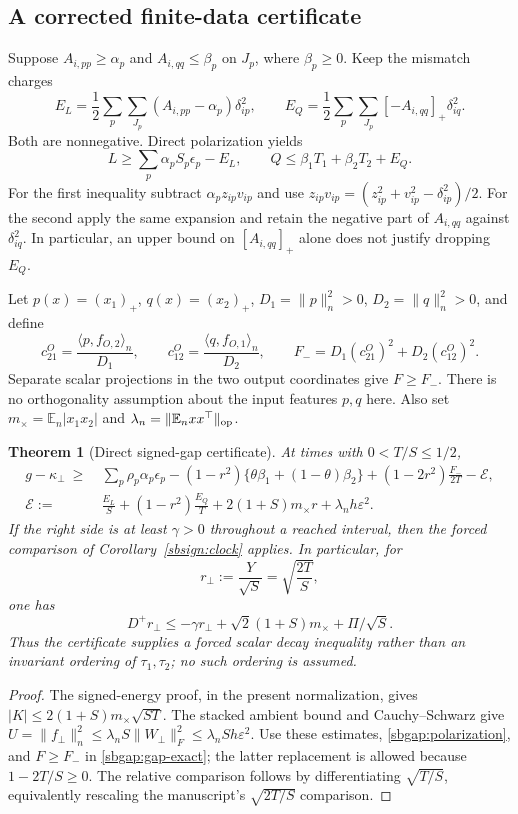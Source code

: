 \documentclass{article} %
\theoremstyle{plain}
\newtheorem{theorem}{Theorem}[section]
\theoremstyle{definition}
\theoremstyle{remark}
\begin{document}
\subsection{A corrected finite-data certificate}

Suppose $A_{i,pp}\ge\alpha_p$ and $A_{i,qq}\le\beta_p$ on $J_p$,
where $\beta_p\ge0$. Keep the mismatch charges
\[
 E_L=\frac12\sum_p\sum_{J_p}(A_{i,pp}-\alpha_p)\delta_{ip}^2,\qquad
 E_Q=\frac12\sum_p\sum_{J_p}[-A_{i,qq}]_+\delta_{iq}^2.
\]
Both are nonnegative. Direct polarization yields
\begin{equation}\label{sbgap:polarization}
 L\ge\sum_p\alpha_p S_p\epsilon_p-E_L,\qquad
 Q\le\beta_1T_1+\beta_2T_2+E_Q.
\end{equation}
For the first inequality subtract $\alpha_p z_{ip}v_{ip}$ and use
$z_{ip}v_{ip}=(z_{ip}^2+v_{ip}^2-\delta_{ip}^2)/2$.
For the second apply the same expansion and retain the negative part of
$A_{i,qq}$ against $\delta_{iq}^2$. In particular, an upper bound on
$[A_{i,qq}]_+$ alone does not justify dropping $E_Q$.

Let $p(x)=(x_1)_+$, $q(x)=(x_2)_+$,
$D_1=\|p\|_n^2>0$, $D_2=\|q\|_n^2>0$, and define
\[
 c_{21}^O=\frac{\langle p,f_{O,2}\rangle_n}{D_1},\qquad
 c_{12}^O=\frac{\langle q,f_{O,1}\rangle_n}{D_2},\qquad
 F_- =D_1(c_{21}^O)^2+D_2(c_{12}^O)^2.
\]
Separate scalar projections in the two output coordinates give $F\ge F_-$.
There is no orthogonality assumption about the input features $p,q$ here.
Also set $m_\times=\mathbb E_n|x_1x_2|$ and
$\lambda_n=\|\mathbb E_nxx^\top\|_{\rm op}$.

\begin{theorem}[Direct signed-gap certificate]\label{sbgap:certificate}
At times with $0<T/S\le1/2$,
\begin{align}
 g-\kappa_\perp\ \ge\ 
 &\sum_p\rho_p\alpha_p\epsilon_p
 -(1-r^2)\{\theta\beta_1+(1-\theta)\beta_2\}
 +(1-2r^2)\frac{F_-}{2T}-\mathcal E,\label{sbgap:certificate-eq}\\
 \mathcal E:={}&\frac{E_L}{S}+(1-r^2)\frac{E_Q}{T}
        +2(1+S)m_\times r+\lambda_n h\varepsilon^2.\nonumber
\end{align}
If the right side is at least $\gamma>0$ throughout a reached interval,
then the forced comparison of Corollary~\ref{sbsign:clock} applies.  In
particular, for
\[
 r_\perp:=\frac{Y}{\sqrt S}=\sqrt{\frac{2T}{S}},
\]
one has
\[
 D^+r_\perp
 \le-\gamma r_\perp
 +\sqrt2(1+S)m_\times+\Pi/\sqrt S.
\]
Thus the certificate supplies a forced scalar decay inequality rather than
an invariant ordering of $\tau_1,\tau_2$; no such ordering is assumed.
\end{theorem}
\begin{proof}
The signed-energy proof, in the present normalization, gives
$|K|\le2(1+S)m_\times\sqrt{ST}$.
The stacked ambient bound and Cauchy--Schwarz give
$U=\|f_\perp\|_n^2\le\lambda_n S\|W_\perp\|_F^2
\le\lambda_n S h\varepsilon^2$.
Use these estimates, \eqref{sbgap:polarization}, and $F\ge F_-$ in
\eqref{sbgap:gap-exact}; the latter replacement is allowed because
$1-2T/S\ge0$. The relative comparison follows by differentiating
$\sqrt{T/S}$, equivalently rescaling the manuscript's
$\sqrt{2T/S}$ comparison.
\end{proof}
\end{document}
